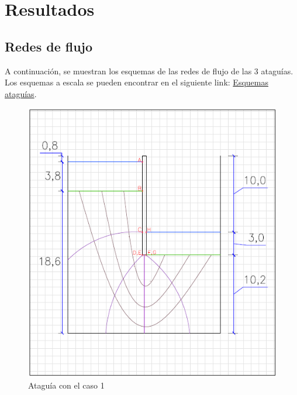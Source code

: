\documentclass{article}
\begin{document}
\newpage

\section{Resultados}
\subsection{Redes de flujo}
A continuación, se muestran los esquemas de las redes de flujo de las 3 ataguías. Los esquemas a escala se pueden encontrar en el siguiente link: \href{https://github.com/berckanala/Proyecto-1-MCOC/tree/main/redes_flujo}{Esquemas ataguías}.

\begin{figure}[h]
    \centering
    \begin{minipage}{0.32\textwidth}
        \centering
        \includegraphics[width=\textwidth]{graficos/At_caso1.png}
        \caption{Ataguía con el caso 1}
        \label{fig:At_caso1}
    \end{minipage}
    \hfill
    \begin{minipage}{0.32\textwidth}
        \centering

\end{minipage}
\end{figure}
\end{document}
